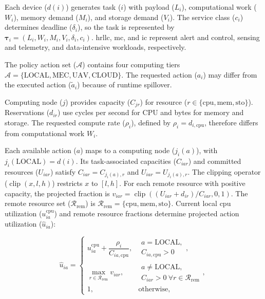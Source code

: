 \documentclass[journal]{IEEEtran}
\begin{document}
Each device (\(d(i)\)) generates task (\(i\)) with payload (\(L_i\)), computational work (\(W_i\)), memory demand (\(M_i\)), and storage demand (\(V_i\)). The service class (\(c_i\)) determines deadline (\(\delta_i\)), so the task is represented by \(\boldsymbol{\tau}_i=(L_i,W_i,M_i,V_i,\delta_i,c_i)\). \acs{hrllc}, \acs{mc}, and \acs{ic} represent alert and control, sensing and telemetry, and data-intensive workloads, respectively.

The policy action set (\(\mathcal A\)) contains four computing tiers $\mathcal A=\{\mathrm{LOCAL},\!\mathrm{MEC},\!\mathrm{UAV},\!\mathrm{CLOUD}\}$. The requested action (\(a_i\)) may differ from the executed action (\(\tilde a_i\)) because of runtime spillover.

Computing node (\(j\)) provides capacity (\(C_{jr}\)) for resource (\(r\in\{\mathrm{cpu},\mathrm{mem},\mathrm{sto}\}\)). Reservations (\(d_{ir}\)) use cycles per second for CPU and bytes for memory and storage. The requested compute rate (\(\rho_i\)), defined by \(\rho_i=d_{i,\mathrm{cpu}}\), therefore differs from computational work \(W_i\).

Each available action (\(a\)) maps to a computing node (\(j_i(a)\)), with \(j_i(\mathrm{LOCAL})=d(i)\). Its task-associated capacities (\(C_{iar}\)) and committed resources (\(U_{iar}\)) satisfy \(C_{iar}=C_{j_i(a),r}\) and \(U_{iar}=U_{j_i(a),r}\). The clipping operator (\(\operatorname{clip}(x,l,h)\)) restricts \(x\) to \([l,h]\). For each remote resource with positive capacity, the projected fraction is \(v_{iar}=\operatorname{clip}((U_{iar}+d_{ir})/C_{iar},0,1)\). The remote resource set (\(\mathcal R_{\mathrm{rem}}\)) is \(\mathcal R_{\mathrm{rem}}=\{\mathrm{cpu},\mathrm{mem},\mathrm{sto}\}\). Current local \acs{cpu} utilization (\(u_{ia}^{\mathrm{cpu}}\)) and remote resource fractions determine projected action utilization (\(\widehat u_{ia}\)):

\begin{equation}
\label{eq:projected-utilization}
\widehat u_{ia}=
\begin{cases}
u_{ia}^{\mathrm{cpu}}
+\dfrac{\rho_i}{C_{ia,\mathrm{cpu}}},
&\begin{gathered}a=\mathrm{LOCAL},\\
C_{ia,\mathrm{cpu}}>0\end{gathered},\\[2mm]
\displaystyle\max_{r\in\mathcal R_{\mathrm{rem}}}v_{iar},
&\begin{gathered}a\neq\mathrm{LOCAL},\\
C_{iar}>0\ \forall r\in\mathcal R_{\mathrm{rem}}\end{gathered},\\
1,&\text{otherwise},
\end{cases}
\end{equation}
\end{document}
